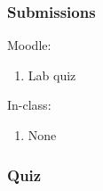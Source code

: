 \documentclass[12pt]{article}
\begin{document}
\subsubsection{Submissions}

Moodle:
\begin{enumerate}
\item Lab quiz
\end{enumerate}

\noindent
In-class:
\begin{enumerate}
\item None
\end{enumerate}


\subsubsection{Quiz}
\end{document}
